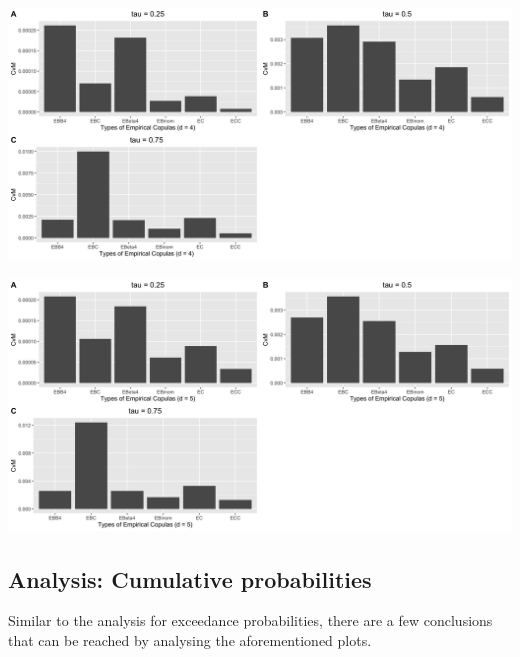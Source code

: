 \documentclass[12pt]{report}
\newcommand{\1}{\mathbf{1}}
\begin{document}
\begin{flushleft}
\begin{center}
\label{C_4d_c_CvM}
\includegraphics[width=17cm]{CumulativeCvM/C_4d_c_CvM.png}
\end{center}%

\begin{center}
\label{C_5d_c_CvM}
\includegraphics[width=17cm]{CumulativeCvM/C_5d_c_CvM.png}
\end{center}%

\newpage
\subsection{Analysis: Cumulative probabilities}
Similar to the analysis for exceedance probabilities, there are a few conclusions that can be reached by analysing the aforementioned plots.\\

\end{flushleft}
\end{document}
